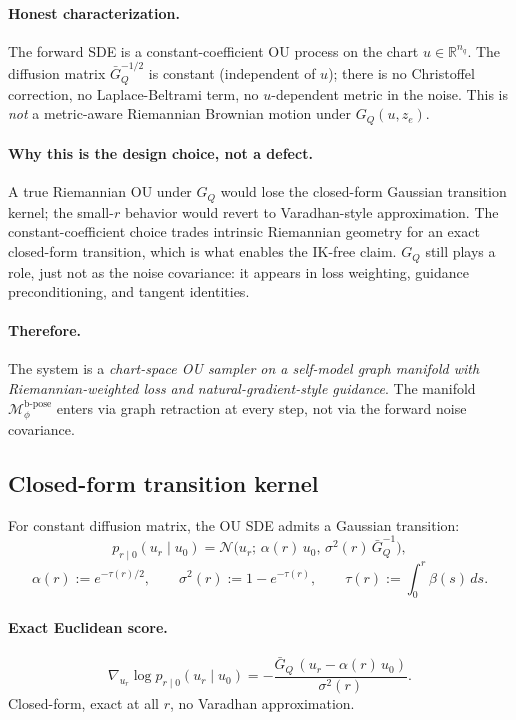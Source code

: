 \documentclass[11pt,a4paper]{article}
\newcommand{\R}{\mathbb{R}}
\newcommand{\N}{\mathcal{N}}
\newcommand{\Mbpose}{\mathcal{M}_\phi^{\text{b-pose}}}
\newcommand{\GQ}{G_Q}
\newcommand{\GQbar}{\bar G_Q}
\begin{document}
\paragraph{Honest characterization.} The forward SDE is a constant-coefficient OU process on the chart $u \in \R^{n_q}$. The diffusion matrix $\GQbar^{-1/2}$ is constant (independent of $u$); there is no Christoffel correction, no Laplace-Beltrami term, no $u$-dependent metric in the noise. This is \emph{not} a metric-aware Riemannian Brownian motion under $\GQ(u, z_e)$.

\paragraph{Why this is the design choice, not a defect.} A true Riemannian OU under $\GQ$ would lose the closed-form Gaussian transition kernel; the small-$r$ behavior would revert to Varadhan-style approximation. The constant-coefficient choice trades intrinsic Riemannian geometry for an exact closed-form transition, which is what enables the IK-free claim. $\GQ$ still plays a role, just not as the noise covariance: it appears in loss weighting, guidance preconditioning, and tangent identities.

\paragraph{Therefore.} The system is a \emph{chart-space OU sampler on a self-model graph manifold with Riemannian-weighted loss and natural-gradient-style guidance}. The manifold $\Mbpose$ enters via graph retraction at every step, not via the forward noise covariance.

\subsection{Closed-form transition kernel}

For constant diffusion matrix, the OU SDE admits a Gaussian transition:
\begin{equation}
\boxed{ p_{r \mid 0}(u_r \mid u_0) = \N\!\bigl(u_r;\, \alpha(r)\, u_0,\, \sigma^2(r)\, \GQbar^{-1}\bigr), }
\end{equation}
\begin{equation}
\alpha(r) := e^{-\tau(r)/2}, \qquad \sigma^2(r) := 1 - e^{-\tau(r)}, \qquad \tau(r) := \int_0^r \beta(s)\, ds.
\end{equation}

\paragraph{Exact Euclidean score.}
\begin{equation}
\boxed{ \nabla_{u_r} \log p_{r \mid 0}(u_r \mid u_0) = -\frac{\GQbar\, (u_r - \alpha(r)\, u_0)}{\sigma^2(r)}. }
\end{equation}
Closed-form, exact at all $r$, no Varadhan approximation.
\end{document}
